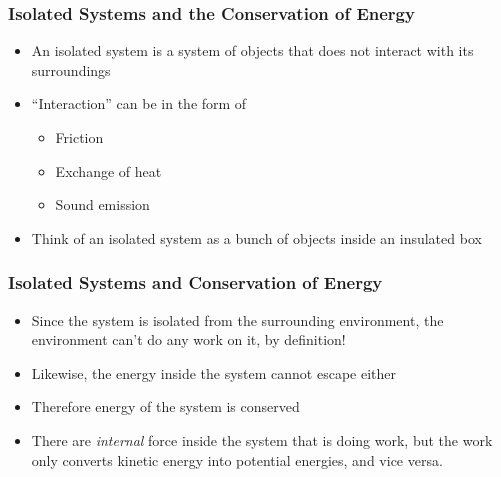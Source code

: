 \documentclass[12pt,compress,aspectratio=169]{beamer}
\begin{document}
\begin{frame}
  \frametitle{Isolated Systems and the Conservation of Energy}
  \begin{itemize}
  \item An isolated system is a system of objects that does not interact with
    its surroundings
  \item ``Interaction'' can be in the form of
    \begin{itemize}
    \item Friction
    \item Exchange of heat
    \item Sound emission
    \end{itemize}
  \item Think of an isolated system as a bunch of objects inside an insulated
    box
  \end{itemize}
  \begin{center}
  \end{center}
\end{frame}


\begin{frame}
  \frametitle{Isolated Systems and Conservation of Energy}
  \begin{itemize}
  \item Since the system is isolated from the surrounding environment, the
    environment can't do any work on it, by definition!
  \item Likewise, the energy inside the system cannot escape either
  \item Therefore energy of the system is conserved
  \item There are \emph{internal} force inside the system that is doing work,
    but the work only converts kinetic energy into potential energies, and vice
    versa.
  \end{itemize}
\end{frame}
\end{document}
